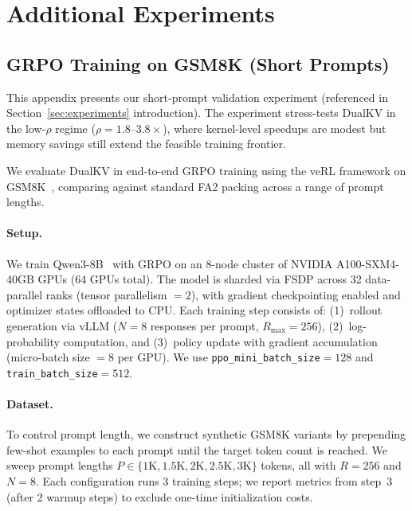 \documentclass{article}
\begin{document}
\section{Additional Experiments}
\label{app:additional-training}

\subsection{GRPO Training on GSM8K (Short Prompts)}
\label{app:gsm8k-shortprompt}

This appendix presents our short-prompt validation experiment (referenced in Section~\ref{sec:experiments} introduction). The experiment stress-tests DualKV in the low-$\rho$ regime ($\rho = 1.8$--$3.8\times$), where kernel-level speedups are modest but memory savings still extend the feasible training frontier.

We evaluate DualKV in end-to-end GRPO training using the veRL framework on GSM8K~\citep{cobbe2021gsm8k}, comparing against standard FA2 packing across a range of prompt lengths.

\paragraph{Setup.} We train Qwen3-8B~\citep{yang2025qwen3} with GRPO on an 8-node cluster of NVIDIA A100-SXM4-40GB GPUs (64 GPUs total). The model is sharded via FSDP across 32 data-parallel ranks (tensor parallelism $=2$), with gradient checkpointing enabled and optimizer states offloaded to CPU. Each training step consists of: (1)~rollout generation via vLLM ($N{=}8$ responses per prompt, $R_{\max}{=}256$), (2)~log-probability computation, and (3)~policy update with gradient accumulation (micro-batch size $=8$ per GPU). We use \texttt{ppo\_mini\_batch\_size}${}=128$ and \texttt{train\_batch\_size}${}=512$.

\paragraph{Dataset.} To control prompt length, we construct synthetic GSM8K variants by prepending few-shot examples to each prompt until the target token count is reached. We sweep prompt lengths $P \in \{1\text{K}, 1.5\text{K}, 2\text{K}, 2.5\text{K}, 3\text{K}\}$ tokens, all with $R{=}256$ and $N{=}8$. Each configuration runs 3 training steps; we report metrics from step~3 (after 2 warmup steps) to exclude one-time initialization costs.
\end{document}
